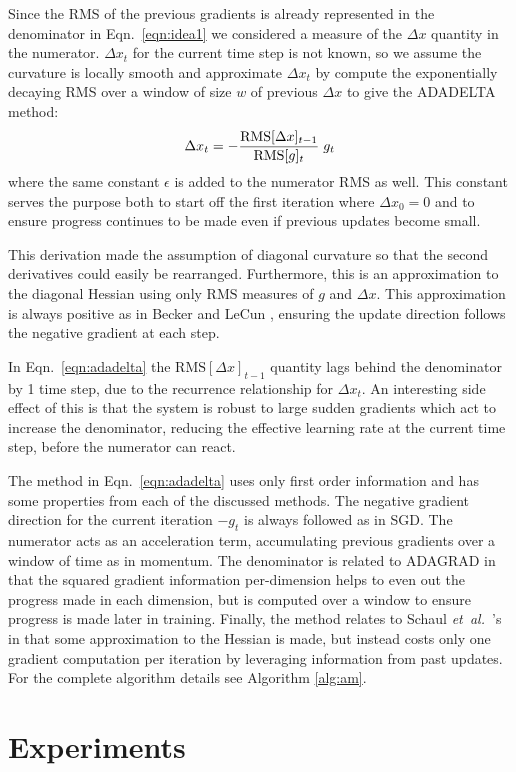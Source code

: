\documentclass{article}
\def\BE{\vspace{-2.0mm}\begin{equation}}
\def\EE{\vspace{-1.4mm}\end{equation}}
\newcommand{\alg}[1]{Algorithm \ref{alg:#1}}
\newcommand{\eqn}[1]{Eqn.~\ref{eqn:#1}}
\def\etal{{\textit{et~al.~}}}
\begin{document}
Since the RMS of the previous gradients is already represented in the denominator in \eqn{idea1} we
considered a measure of the $\Delta x$ quantity in the numerator. $\Delta x_t$ for the current time
step is not known, so we assume the curvature is locally smooth and approximate $\Delta x_t$
by compute the exponentially decaying RMS over a window of size $w$ of previous $\Delta x$ to give
the ADADELTA method:
\BE
\Delta x_t = - \frac{\text{RMS}[\Delta x]_{t-1}}{\text{RMS}[g]_{t}} \; g_t
\label{eqn:adadelta}
\EE
where the same constant $\epsilon$ is added to the numerator RMS as well. This constant serves the
purpose both to start off the first iteration where $\Delta x_0 = 0$ and to ensure progress
continues to be made even if previous updates become small.



This derivation made the assumption of diagonal curvature so that the second derivatives
could easily be rearranged. Furthermore, this is an approximation to the diagonal Hessian using only
$\text{RMS}$ measures of $g$ and $\Delta x$. This approximation is always positive
as in Becker and LeCun \cite{becker1988}, ensuring the update direction follows the
negative gradient at each step.

In \eqn{adadelta} the $\text{RMS}[\Delta x]_{t-1}$ quantity lags behind the denominator by 1 time
step, due to the recurrence relationship for $\Delta x_t$. An interesting side effect of this is
that the system is robust to large sudden gradients which act to increase the denominator, reducing
the effective learning rate at the current time step, before the numerator can react.


The method in \eqn{adadelta} uses only first order information and has some properties from each of
the discussed methods. The negative gradient direction for the current iteration $-g_t$ is always
followed as in SGD. The numerator acts as an acceleration term, accumulating previous gradients over
a window of time as in momentum. The denominator is related to ADAGRAD in that the squared gradient
information per-dimension helps to even out the progress made in each dimension, but is computed
over a window to ensure progress is made later in training. Finally, the method relates to Schaul
\etal's in that some approximation to the Hessian is made, but instead costs only one gradient
computation per iteration by leveraging information from past updates. For the complete algorithm
details see \alg{am}.

\section{Experiments} \label{sec:experiments}
\end{document}
